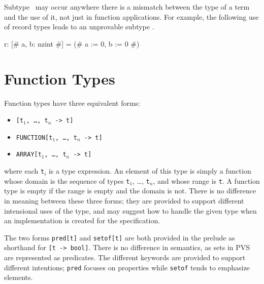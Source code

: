 Subtype \tccs\ may occur anywhere there is a mismatch between the type of
a term and the use of it, not just in function applications.  For example,
the following use of record types leads to an unprovable subtype \tcc.
\begin{pvsex}
  r: [# a, b: nzint #] = (# a := 0, b := 0 #)
\end{pvsex}



\section{Function Types}\label{function-types}

Function types have three equivalent forms:
\begin{itemize}
\item \texttt{[t\(_1\), \ldots, t\(_n\) -> t]}

\item \texttt{FUNCTION[t\(_1\), \ldots, t\(_n\) -> t]}

\item \texttt{ARRAY[t\(_1\), \ldots, t\(_n\) -> t]}
\end{itemize}
%
where each \texttt{t$_i$} is a type expression.  An element of this type is
simply a function whose domain is the sequence of types \texttt{t$_1$},
\ldots, \texttt{t$_n$}, and whose range is \texttt{t}.  A function type is empty
if the range is empty and the domain is not.  There is no difference in
meaning between these three forms; they are provided to support different
intensional uses of the type, and may suggest how to handle the given type
when an implementation is created for the specification.

The two forms \texttt{pred[t]} and \texttt{setof[t]} are both provided in the
prelude as shorthand for \texttt{[t ->
bool]}.  There is no difference in semantics, as sets in
PVS are represented as predicates.  The different keywords are
provided to support different intentions; \texttt{pred} focuses on
properties while \texttt{setof} tends to emphasize elements.

